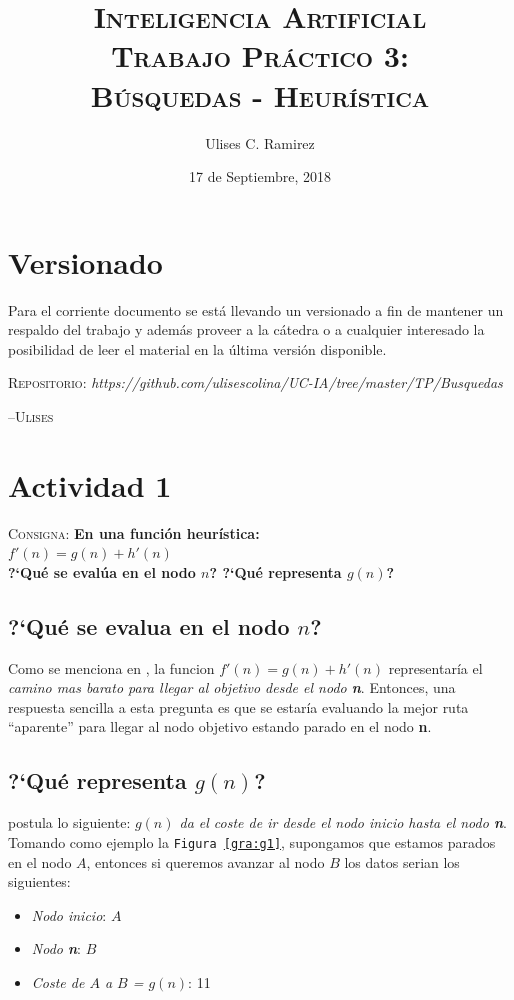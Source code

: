 \documentclass{article}
\title{\textsc{Inteligencia Artificial\\Trabajo Pr\'actico 3:\\B\'usquedas - Heur\'istica}}
\author{Ulises C. Ramirez}
\date{17 de Septiembre, 2018}
\begin{document}
\maketitle
{}
\newpage
\section*{Versionado}
Para el corriente documento se est\'a llevando un versionado a fin de mantener un respaldo del trabajo y adem\'as proveer a la c\'atedra o a cualquier interesado la posibilidad de leer el material en la \'ultima versi\'on disponible.\\

\begin{center}
  \textsc{Repositorio}: \textit{https://github.com/ulisescolina/UC-IA/tree/master/TP/Busquedas}
\end{center}


\hfill--\textsc{Ulises}
\tableofcontents
{}
\newpage

\section{Actividad 1}
\textsc{Consigna}: \textbf{En una funci\'on heur\'istica:\\$f'(n)=g(n)+h'(n)$\\?`Qu\'e se eval\'ua en el nodo $n$? ?`Qu\'e representa $g(n)$?}
\subsection{?`Qu\'e se evalua en el nodo $n$?}
Como se menciona en \cite{russel}, la funcion $f'(n)=g(n)+h'(n)$ representar\'ia el \textit{camino mas barato para llegar al objetivo desde el nodo \textbf{n}}. Entonces, una respuesta sencilla a esta pregunta es que se estar\'ia evaluando la mejor ruta ``aparente'' para llegar al nodo objetivo estando parado en el nodo \textbf{n}.
\subsection{?`Qu\'e representa $g(n)$?}
\cite{russel} postula lo siguiente: \textit{$g(n)$ da el coste de ir desde el nodo inicio hasta el nodo \textbf{n}}. Tomando como ejemplo la \texttt{Figura \ref{gra:g1}}, supongamos que estamos parados en el nodo $A$, entonces si queremos avanzar al nodo $B$ los datos serian los siguientes:\\
\begin{itemize}
\item \textit{Nodo inicio}: $A$
\item \textit{Nodo \textbf{n}}: $B$
\item \textit{Coste de $A$ a $B$ = $g(n)$}: 11
\end{itemize}
\end{document}
